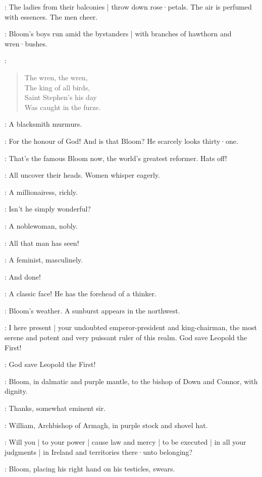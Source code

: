 :
The ladies from their balconies |
throw down rose·petals.
The air is perfumed with essences.
The men cheer.

:
Bloom's boys run amid the bystanders |
with branches of hawthorn and wren·bushes.

\BloomsBoys:
\begin{verse}
    The wren, the wren,\\
    The king of all birds,\\
    Saint Stephen's his day\\
    Was caught in the furze.
\end{verse}

:
A blacksmith murmurs.

\Blacksmith:
For the honour of God!
And is that Bloom?
He scarcely looks thirty·one.

\Flagger[1]:
That's the famous Bloom now,
the world's greatest reformer.
Hats off!

:
All uncover their heads.
Women whisper eagerly.

:
A millionairess,
richly.

\Millionairess:
Isn't he simply wonderful?

:
A noblewoman,
nobly.

\Noblewoman:
All that man has seen!

:
A feminist,
masculinely.

\Feminist:
And done!

\Bellhanger[2]:
A classic face!
He has the forehead of a thinker.

:
Bloom's weather.
A sunburst appears in the northwest.

\DownConnor[2]:
I here present |
your undoubted emperor-president and king-chairman,
the most serene and potent and very puissant ruler of this realm.
God save Leopold the First!

\All:
God save Leopold the First!

:
Bloom,
in dalmatic and purple mantle,
to the bishop of Down and Connor,
with dignity.

\Bloom:
Thanks,
somewhat eminent sir.

:
William,
Archbishop of Armagh,
in purple stock and shovel hat.

\WillArmagh:
Will you |
to your power |
cause law and mercy |
to be executed |
in all your judgments |
in Ireland and territories there·unto belonging?

:
Bloom,
placing his right hand on his testicles,
swears.


